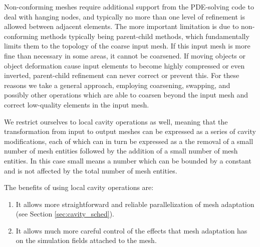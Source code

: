 Non-conforming meshes require additional support from
the PDE-solving code to deal with hanging nodes, and typically
no more than one level of refinement is allowed between adjacent
elements.
The more important limitation is due to non-conforming methods
typically being parent-child methods, which fundamentally limits
them to the topology of the coarse input mesh.
If this input mesh is more fine than necessary in some areas,
it cannot be coarsened.
If moving objects or object deformation cause input elements
to become highly compressed or even inverted, parent-child
refinement can never correct or prevent this.
For these reasons we take a general approach, employing
coarsening, swapping, and possibly other operations which are
able to coarsen beyond the input mesh and correct low-quality
elements in the input mesh.

We restrict ourselves to local cavity operations as well,
meaning that the transformation from input to output meshes
can be expressed as a series of cavity modifications, each
of which can in turn be expressed as a the removal of
a small number of mesh entities followed by the addition
of a small number of mesh entities.
In this case small means a number which can be bounded
by a constant and is not affected by the total number
of mesh entities.

The benefits of using local cavity operations are:
\begin{enumerate}
\item It allows more straightforward and reliable parallelization of
mesh adaptation (see Section \ref{sec:cavity_sched}).
\item It allows much more careful control of the effects that mesh
adaptation has on the simulation fields attached to the mesh.
\end{enumerate}

